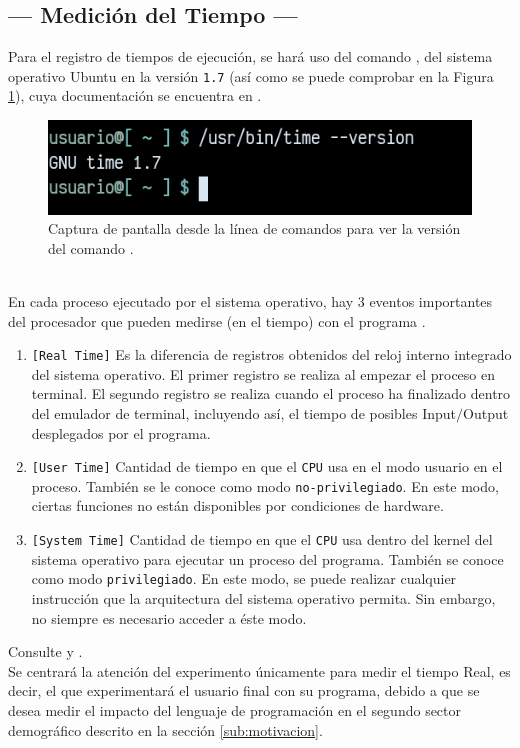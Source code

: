 \documentclass[11pt,a4paper]{article}
\begin{document}

\subsection{--- Medición del Tiempo ---} %
\label{sub:medicion_tiempo}
Para el registro de tiempos de ejecución, se hará uso del comando , del sistema operativo Ubuntu en la versión \texttt{1.7} (así como se puede comprobar en la Figura \ref{fig:time}), cuya documentación se encuentra en .
\begin{figure}[hbt!]
	\centering
	\includegraphics[width= 0.4 \linewidth]{IMAGENES/3/time.png}
	\caption{Captura de pantalla desde la línea de comandos para ver la versión del comando .}
	\label{fig:time}
\end{figure}\\
En cada proceso ejecutado por el sistema operativo, hay 3 eventos importantes del procesador que pueden medirse (en el tiempo) con el programa .
\begin{enumerate}[noitemsep]
	\item \texttt{[Real Time]} Es la diferencia de registros obtenidos del reloj interno integrado del sistema operativo. El primer registro se realiza al empezar el proceso en terminal. El segundo registro se realiza cuando el proceso ha finalizado dentro del emulador de terminal, incluyendo así, el tiempo de posibles Input\(/\)Output desplegados por el programa.
	\item \texttt{[User Time]} Cantidad de tiempo en que el \texttt{CPU} usa en el modo usuario en el proceso.
		También se le conoce como modo \texttt{no-privilegiado}.
		En este modo, ciertas funciones no están disponibles por condiciones de hardware.
	\item \texttt{[System Time]} Cantidad de tiempo en que el \texttt{CPU} usa dentro del kernel del sistema operativo para ejecutar un proceso del programa.
		También se conoce como modo \texttt{privilegiado}.
		En este modo, se puede realizar cualquier instrucción que la arquitectura del sistema operativo permita. Sin embargo, no siempre es necesario acceder a éste modo.
\end{enumerate}
Consulte  y . \\[2mm]
Se centrará la atención del experimento únicamente para medir el tiempo Real, es decir, el que experimentará el usuario final con su programa, debido a que se desea medir el impacto del lenguaje de programación en el segundo sector demográfico descrito en la sección \ref{sub:motivacion}.
\end{document}
